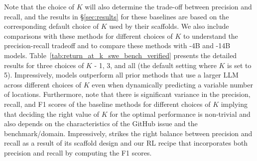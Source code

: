 Note that the choice of $K$ will also determine the trade-off between precision and recall, and the results in \S\ref{sec:results} for these baselines are based on the corresponding default choice of $K$ used by their scaffolds. We also include comparisons with these methods for different choices of $K$ to understand the precision-recall tradeoff and to compare these methods with \methodname-4B and \methodname-14B models. Table~\ref{tab:return_at_k_swe_bench_verified} presents the detailed results for three choices of $K$ - 1, 3, and all (the default setting where $K$ is set to 5). Impressively, \methodname models outperform all prior methods that use a larger LLM across different choices of $K$ even when dynamically predicting a variable number of locations. Furthermore, note that there is significant variance in the precision, recall, and F1 scores of the baseline methods for different choices of $K$ implying that deciding the right value of $K$ for the optimal performance is non-trivial and also depends on the characteristics of the GitHub issue and the benchmark/domain. Impressively, \methodname strikes the right balance between precision and recall as a result of its scaffold design and our RL recipe that incorporates both precision and recall by computing the F1 scores.
